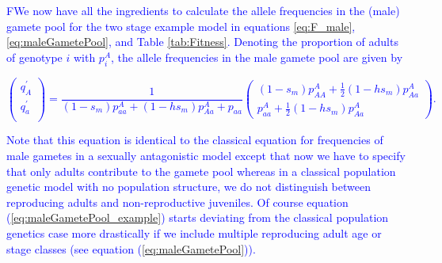 \documentclass[11pt]{article}
\begin{document}
\textcolor{blue}{ FWe now have all the ingredients to calculate the allele frequencies in the (male) gamete pool for the two stage example model in equations \ref{eq:F_male}, \ref{eq:maleGametePool}, and Table \ref{tab:Fitness}. Denoting the proportion of adults of genotype $i$ with $p^A_i$, the allele frequencies in the male gamete pool are given by 
\begin{linenomath*}
\begin{equation} \label{eq:maleGametePool_example}
\left(
		\begin{array}{c}
			q^{\prime}_{A} \\
			q^{\prime}_{a} \\
		\end{array} \right) = 
				\frac{1}{(1-s_m)p^A_{aa}+ (1-hs_m)p^A_{Aa}+p_{aa}}\left(
		\begin{array}{c}
(1-s_m)p^A_{AA}	+\frac{1}{2}(1-hs_m)p^A_{Aa}\\
p^A_{aa}+\frac{1}{2}(1-hs_m)p^A_{Aa}
		\end{array} \right).
\end{equation}
\end{linenomath*}
Note that this equation is identical to the classical equation for frequencies of male gametes in a sexually antagonistic model except that now we have to specify that only adults contribute to the gamete pool whereas in a classical population genetic model with no population structure, we do not distinguish between reproducing adults and non-reproductive juveniles. Of course equation (\ref{eq:maleGametePool_example}) starts deviating from the classical population genetics case more drastically if we include multiple reproducing adult age or stage classes (see equation (\ref{eq:maleGametePool})).  }
\end{document}
